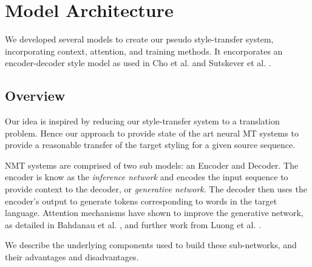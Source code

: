 \documentclass[twoside,twocolumn]{article}
\begin{document}
\section{Model Architecture}
\label{sec:models}
We developed several models to create our pseudo style-transfer system,
incorporating context, attention, and training methods. It encorporates
an encoder-decoder style model as used in Cho et al. \cite{cho2014learning}
and Sutskever et al. \cite{sutskever2014sequence}.
\subsection{Overview}
Our idea is inspired by reducing our style-transfer system to a translation
problem. Hence our approach to provide state of the art neural MT systems to
provide a reasonable transfer of the target styling for a given source sequence.

NMT systems are comprised of two sub models: an Encoder and Decoder. The
encoder is know as the \emph{inference network} and encodes the input sequence
to provide context to the decoder, or \emph{generative network}. The decoder
then uses the encoder's output to generate tokens corresponding to words
in the target language. Attention mechanisms have shown to improve the
generative network, as detailed in Bahdanau et al. \cite{bahdanau2014neural},
and further work from Luong et al. \cite{luong2015effective}.

We describe the underlying components used to build these sub-networks, and
their advantages and disadvantages.
\end{document}
